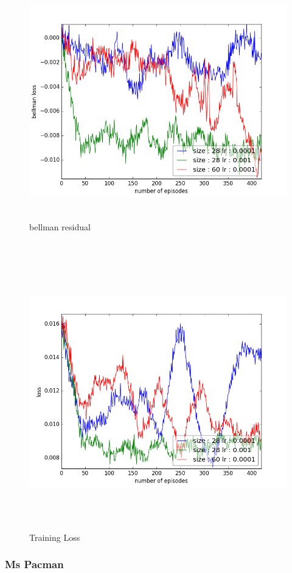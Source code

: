 \documentclass{report}
\begin{document}
\begin{figure}[H]
    \begin{minipage}[c]{.49\linewidth}
        \centering
        \includegraphics[width = \linewidth]{plots/b3/Boxing-v3/bellmanLossArray.png}
        \caption{bellman residual}
    \end{minipage}
    \hfill%
    \begin{minipage}[c]{.49\linewidth}
        \centering
        \includegraphics[width = \linewidth]{plots/b3/Boxing-v3/lossArray.png}
        \caption{Training Loss}
    \end{minipage}
\end{figure}

\subsubsection*{Ms Pacman}
\end{document}

